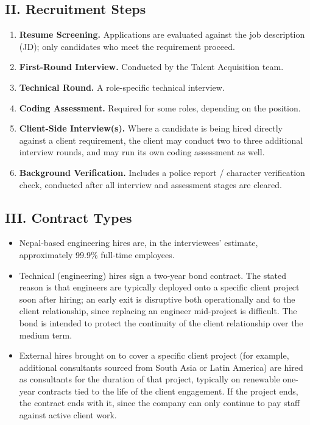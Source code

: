 \documentclass[12pt,a4paper]{report}
\begin{document}
\subsection*{II. Recruitment Steps}
\begin{enumerate}[leftmargin=1.5cm]
  \item \textbf{Resume Screening.} Applications are evaluated against the job description (JD); only candidates who meet the requirement proceed.
  \item \textbf{First-Round Interview.} Conducted by the Talent Acquisition team.
  \item \textbf{Technical Round.} A role-specific technical interview.
  \item \textbf{Coding Assessment.} Required for some roles, depending on the position.
  \item \textbf{Client-Side Interview(s).} Where a candidate is being hired directly against a client requirement, the client may conduct two to three additional interview rounds, and may run its own coding assessment as well.
  \item \textbf{Background Verification.} Includes a police report / character verification check, conducted after all interview and assessment stages are cleared.
\end{enumerate}

\subsection*{III. Contract Types}
\begin{itemize}[leftmargin=1.5cm]
  \item Nepal-based engineering hires are, in the interviewees' estimate, approximately 99.9\% full-time employees.
  \item Technical (engineering) hires sign a two-year bond contract. The stated reason is that engineers are typically deployed onto a specific client project soon after hiring; an early exit is disruptive both operationally and to the client relationship, since replacing an engineer mid-project is difficult. The bond is intended to protect the continuity of the client relationship over the medium term.
  \item External hires brought on to cover a specific client project (for example, additional consultants sourced from South Asia or Latin America) are hired as consultants for the duration of that project, typically on renewable one-year contracts tied to the life of the client engagement. If the project ends, the contract ends with it, since the company can only continue to pay staff against active client work.
\end{itemize}
\end{document}
